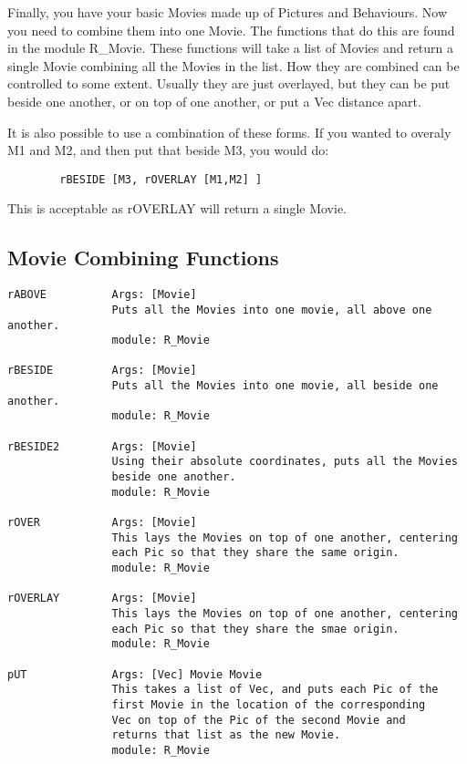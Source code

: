 	Finally, you have your basic Movies made up of Pictures and Behaviours.
Now you need to combine them into one Movie. The functions that do this
are found in the module R\_Movie. These functions will take a list of
Movies and return a single Movie combining all the Movies in the list.
How they are combined can be controlled to some extent. Usually they are
just overlayed, but they can be put beside one another, or on top of
one another, or put a Vec distance apart.

	It is also possible to use a combination of these forms. If you wanted
to overaly M1 and M2, and then put that beside M3, you would do:
\begin{verbatim}
        rBESIDE [M3, rOVERLAY [M1,M2] ]
\end{verbatim}
This is acceptable as rOVERLAY will return a single Movie. 

\subsection{Movie Combining Functions}

\begin{verbatim}
rABOVE          Args: [Movie]
                Puts all the Movies into one movie, all above one another.
                module: R_Movie

rBESIDE         Args: [Movie]
                Puts all the Movies into one movie, all beside one another.
                module: R_Movie

rBESIDE2        Args: [Movie]
                Using their absolute coordinates, puts all the Movies
                beside one another.
                module: R_Movie

rOVER           Args: [Movie]
                This lays the Movies on top of one another, centering 
                each Pic so that they share the same origin.
                module: R_Movie

rOVERLAY        Args: [Movie]
                This lays the Movies on top of one another, centering
                each Pic so that they share the smae origin.
                module: R_Movie

pUT             Args: [Vec] Movie Movie
                This takes a list of Vec, and puts each Pic of the
                first Movie in the location of the corresponding
                Vec on top of the Pic of the second Movie and
                returns that list as the new Movie.
                module: R_Movie

\end{verbatim}

